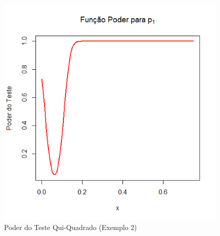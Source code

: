 \documentclass[12pt]{beamer}
\begin{document}
\begin{frame}{}
\begin{block}{}
\begin{figure}
    \centering
    \includegraphics[scale=0.5]{figs/Ex2p1.png}
    \caption{Poder do Teste Qui-Quadrado (Exemplo 2)}
    \label{fig:enter-label}
\end{figure}
\end{block}
\end{frame}
\end{document}
